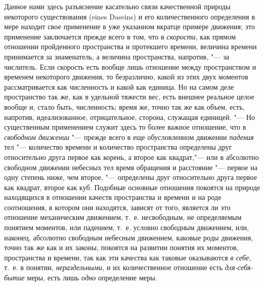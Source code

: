 Данное нами здесь разъяснение касательно связи качественной природы
некоторого существования (eines Daseins) и его количественного определения
в мере находит свое применение в уже указанном вкратце примере движения;
это применение заключается прежде всего в том, что в
{\em скорости}, как прямом отношении пройденного
пространства и протекшего времени, величина времени принимается за
знаменатель, а величина пространства, напротив, "--- за числитель. Если
скорость есть вообще лишь отношение между пространством и временем
некоторого движения, то безразлично, какой из этих двух моментов
рассматривается как численность и какой как единица. Но на самом деле
пространство так же, как в удельной тяжести вес, есть внешнее реальное
целое вообще и, стало быть, численность; время же, точно так же как объем,
есть, напротив, идеализованное, отрицательное, сторона, служащая единицей.
"--- Но существенным применением служит здесь то более важное отношение, что в
{\em свободном движении} "--- прежде всего в еще
обусловленном движении {\em падения} тел "--- количество
времени и количество пространства определены друг относительно друга первое
как корень, а второе как квадрат,"--- или в абсолютно свободном движении
небесных тел время обращения и расстояние "--- первое на одну степень ниже,
чем второе, "--- определены друг относительно друга первое как квадрат, второе
как куб. Подобные основные отношения покоятся на природе находящихся в
отношении качеств пространства и времени и на роде соотношения, в котором
они находятся, зависят от того, является ли это отношение механическим
движением, т.~е. несвободным, не определяемым понятием моментов, или
падением, т.~е. условно свободным движением, или, наконец, абсолютно
свободным небесным движением, каковые роды движения, точно так же как и их
законы, покоятся на развитии понятия их моментов, пространства и времени,
так как эти качества как таковые оказываются {\em в
себе}, т.~е. в понятии, {\em нераздельными}, и их
количественное отношение есть {\em для-себя-бытие}
меры, есть лишь {\em одно} определение меры.

